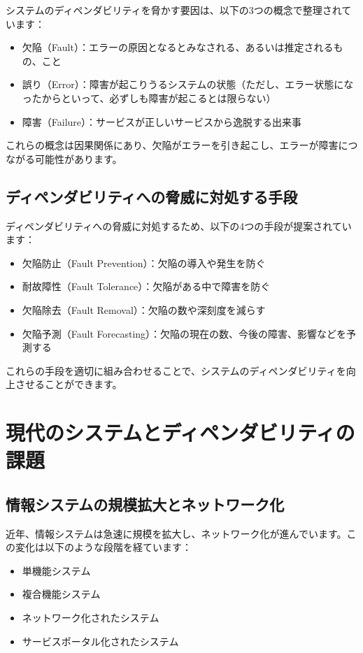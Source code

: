 システムのディペンダビリティを脅かす要因は、以下の3つの概念で整理されています：

\begin{itemize}
\item 欠陥（Fault）：エラーの原因となるとみなされる、あるいは推定されるもの、こと
\item 誤り（Error）：障害が起こりうるシステムの状態（ただし、エラー状態になったからといって、必ずしも障害が起こるとは限らない）
\item 障害（Failure）：サービスが正しいサービスから逸脱する出来事
\end{itemize}

これらの概念は因果関係にあり、欠陥がエラーを引き起こし、エラーが障害につながる可能性があります。

\subsection{ディペンダビリティへの脅威に対処する手段}

ディペンダビリティへの脅威に対処するため、以下の4つの手段が提案されています：
\begin{itemize}
\item 欠陥防止（Fault Prevention）：欠陥の導入や発生を防ぐ
\item 耐故障性（Fault Tolerance）：欠陥がある中で障害を防ぐ
\item 欠陥除去（Fault Removal）：欠陥の数や深刻度を減らす
\item 欠陥予測（Fault Forecasting）：欠陥の現在の数、今後の障害、影響などを予測する
\end{itemize}
これらの手段を適切に組み合わせることで、システムのディペンダビリティを向上させることができます。

\section{現代のシステムとディペンダビリティの課題}

\subsection{情報システムの規模拡大とネットワーク化}

近年、情報システムは急速に規模を拡大し、ネットワーク化が進んでいます。この変化は以下のような段階を経ています：

\begin{itemize}
\item 単機能システム
\item 複合機能システム
\item ネットワーク化されたシステム
\item サービスポータル化されたシステム
\end{itemize}


